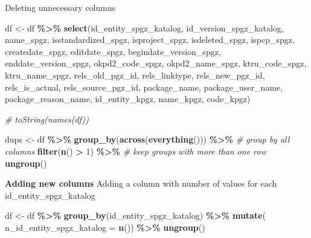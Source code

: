\documentclass[
]{article}
\newenvironment{Shaded}{\begin{snugshade}}{\end{snugshade}}
\newcommand{\AttributeTok}[1]{\textcolor[rgb]{0.13,0.29,0.53}{#1}}
\newcommand{\CommentTok}[1]{\textcolor[rgb]{0.56,0.35,0.01}{\textit{#1}}}
\newcommand{\DecValTok}[1]{\textcolor[rgb]{0.00,0.00,0.81}{#1}}
\newcommand{\FunctionTok}[1]{\textcolor[rgb]{0.13,0.29,0.53}{\textbf{#1}}}
\newcommand{\NormalTok}[1]{#1}
\newcommand{\OtherTok}[1]{\textcolor[rgb]{0.56,0.35,0.01}{#1}}
\newcommand{\SpecialCharTok}[1]{\textcolor[rgb]{0.81,0.36,0.00}{\textbf{#1}}}
\begin{document}
Deleting unnecessary columns

\begin{Shaded}
\begin{Highlighting}[]
\NormalTok{df }\OtherTok{\textless{}{-}}\NormalTok{ df }\SpecialCharTok{\%\textgreater{}\%} 
  \FunctionTok{select}\NormalTok{(id\_entity\_spgz\_katalog, id\_version\_spgz\_katalog, name\_spgz, isstandardized\_spgz, isproject\_spgz, isdeleted\_spgz, }
\NormalTok{  ispcp\_spgz, createdate\_spgz, editdate\_spgz, begindate\_version\_spgz, enddate\_version\_spgz, okpd2\_code\_spgz, }
\NormalTok{  okpd2\_name\_spgz, ktru\_code\_spgz, ktru\_name\_spgz, rels\_old\_pgz\_id, rels\_linktype, rels\_new\_pgz\_id, rels\_is\_actual, }
\NormalTok{  rels\_source\_pgz\_id, package\_name, package\_user\_name, package\_reason\_name, id\_entity\_kpgz, name\_kpgz, code\_kpgz)}

\CommentTok{\# toString(names(df))}
\end{Highlighting}
\end{Shaded}

\begin{Shaded}
\begin{Highlighting}[]
\NormalTok{dups }\OtherTok{\textless{}{-}}\NormalTok{ df }\SpecialCharTok{\%\textgreater{}\%}
  \FunctionTok{group\_by}\NormalTok{(}\FunctionTok{across}\NormalTok{(}\FunctionTok{everything}\NormalTok{())) }\SpecialCharTok{\%\textgreater{}\%}  \CommentTok{\# group by all columns}
  \FunctionTok{filter}\NormalTok{(}\FunctionTok{n}\NormalTok{() }\SpecialCharTok{\textgreater{}} \DecValTok{1}\NormalTok{) }\SpecialCharTok{\%\textgreater{}\%}                 \CommentTok{\# keep groups with more than one row}
  \FunctionTok{ungroup}\NormalTok{()}
\end{Highlighting}
\end{Shaded}

\textbf{Adding new columns} Adding a column with number of values for
each id\_entity\_spgz\_katalog

\begin{Shaded}
\begin{Highlighting}[]
\NormalTok{df }\OtherTok{\textless{}{-}}\NormalTok{ df }\SpecialCharTok{\%\textgreater{}\%} 
  \FunctionTok{group\_by}\NormalTok{(id\_entity\_spgz\_katalog) }\SpecialCharTok{\%\textgreater{}\%} 
  \FunctionTok{mutate}\NormalTok{(}
    \AttributeTok{n\_id\_entity\_spgz\_katalog =} \FunctionTok{n}\NormalTok{()) }\SpecialCharTok{\%\textgreater{}\%} 
  \FunctionTok{ungroup}\NormalTok{()}
\end{Highlighting}
\end{Shaded}
\end{document}
